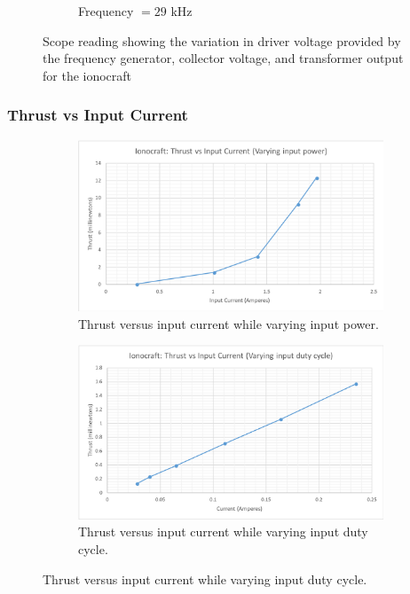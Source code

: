 \documentclass[11pt]{article}
\begin{document}
\begin{figure}[h!]
\begin{subfigure}{0.49\textwidth}
\caption{Frequency $= 29$ kHz}
\label{fig:craft_sc_33}
\end{subfigure}
\caption{\label{fig:thruster_duty} Scope reading showing the variation in driver voltage provided by the frequency generator, collector voltage, and transformer output for the ionocraft}
\end{figure}

\pagebreak
\subsubsection{Thrust vs Input Current}

\begin{figure}[h!]
\centering
\begin{subfigure}{0.49\textwidth}
\centering
\includegraphics[width = \textwidth]{craft_c1}
\caption{\label{fig:craft_c1} Thrust versus input current while varying input power.}
\end{subfigure}
\begin{subfigure}{0.49\textwidth}
\centering
\includegraphics[width = \textwidth]{craft_c2}
\caption{\label{fig:craft_c2} Thrust versus input current while varying input duty cycle.}

\end{subfigure}
\end{figure}
\end{document}
